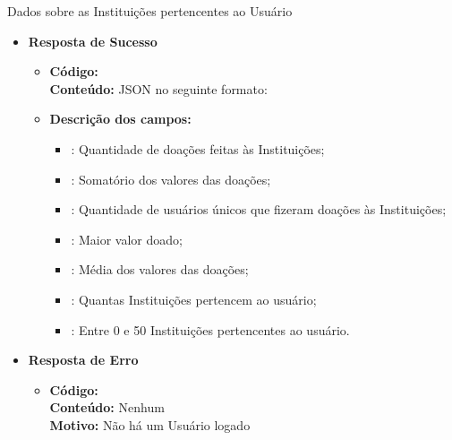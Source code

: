 \begin{caixa}{Dados sobre as Instituições pertencentes ao Usuário}{}
\begin{itemize}
\item \textbf{Resposta de Sucesso}
	\begin{itemize}
		\item \textbf{Código:}  \\ \textbf{Conteúdo:} JSON no seguinte formato: 
        \item \textbf{Descrição dos campos:}
          \begin{itemize}
	        \item {}: Quantidade de doações feitas às Instituições;
            \item {}: Somatório dos valores das doações;
            \item {}: Quantidade de usuários únicos que fizeram doações às Instituições;
            \item {}: Maior valor doado;
            \item {}: Média dos valores das doações;
            \item {}: Quantas Instituições pertencem ao usuário;
            \item {}: Entre 0 e 50 Instituições pertencentes ao usuário.
          \end{itemize}
	\end{itemize}

\item \textbf{Resposta de Erro}
	\begin{itemize}
		\item \textbf{Código:}  \\ \textbf{Conteúdo:} Nenhum \\ \textbf{Motivo:} Não há um Usuário logado
	\end{itemize}

\end{itemize}
\end{caixa}


